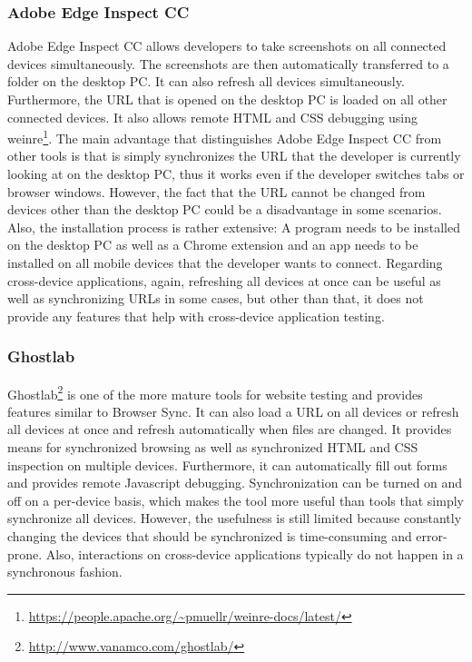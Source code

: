 \subsubsection{Adobe Edge Inspect CC}

Adobe Edge Inspect CC allows developers to take screenshots on all connected devices simultaneously. The screenshots are then automatically transferred to a folder on the desktop PC. It can also refresh all devices simultaneously. Furthermore, the URL that is opened on the desktop PC is loaded on all other connected devices. It also allows remote HTML and CSS debugging using weinre\footnote{\url{https://people.apache.org/~pmuellr/weinre-docs/latest/}}. The main advantage that distinguishes Adobe Edge Inspect CC from other tools is that is simply synchronizes the URL that the developer is currently looking at on the desktop PC, thus it works even if the developer switches tabs or browser windows. However, the fact that the URL cannot be changed from devices other than the desktop PC could be a disadvantage in some scenarios. Also, the installation process is rather extensive: A program needs to be installed on the desktop PC as well as a Chrome extension and an app needs to be installed on all mobile devices that the developer wants to connect. Regarding cross-device applications, again, refreshing all devices at once can be useful as well as synchronizing URLs in some cases, but other than that, it does not provide any features that help with cross-device application testing.

\subsubsection{Ghostlab}

Ghostlab\footnote{\url{http://www.vanamco.com/ghostlab/}} is one of the more mature tools for website testing and provides features similar to Browser Sync. It can also load a URL on all devices or refresh all devices at once and refresh automatically when files are changed. It provides means for synchronized browsing as well as synchronized HTML and CSS inspection on multiple devices. Furthermore, it can automatically fill out forms and provides remote Javascript debugging. Synchronization can be turned on and off on a per-device basis, which makes the tool more useful than tools that simply synchronize all devices. However, the usefulness is still limited because constantly changing the devices that should be synchronized is time-consuming and error-prone. Also, interactions on cross-device applications typically do not happen in a synchronous fashion.

